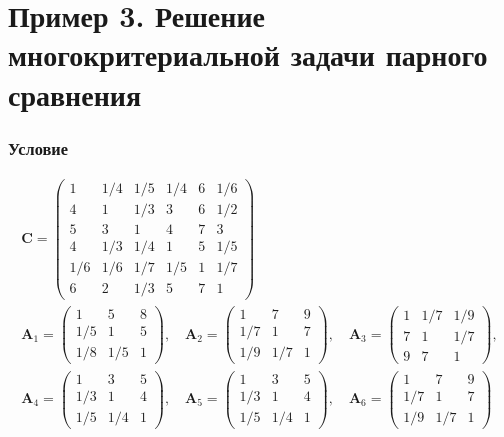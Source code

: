 \documentclass[specialist,
	substylefile = spbu_report.rtx,
	subf,href,colorlinks=true, 12pt]{disser}
\begin{document}
\section{Пример 3. Решение многокритериальной задачи парного сравнения} \label{appendix:full}

\subsubsection{Условие}
$$
	\begin{array}{l}
		\boldsymbol{C}=\left(\begin{array}{cccccc}
				1     & 1 / 4 & 1 / 5 & 1 / 4 & 6 & 1 / 6 \\
				4     & 1     & 1 / 3 & 3     & 6 & 1 / 2 \\
				5     & 3     & 1     & 4     & 7 & 3     \\
				4     & 1 / 3 & 1 / 4 & 1     & 5 & 1 / 5 \\
				1 / 6 & 1 / 6 & 1 / 7 & 1 / 5 & 1 & 1 / 7 \\
				6     & 2     & 1 / 3 & 5     & 7 & 1
			\end{array}\right)                                                                                                                \\
		\boldsymbol{A}_{1}=\left(\begin{array}{ccc}
				1     & 5     & 8 \\
				1 / 5 & 1     & 5 \\
				1 / 8 & 1 / 5 & 1
			\end{array}\right), \quad \boldsymbol{A}_{2}=\left(\begin{array}{ccc}
				1     & 7     & 9 \\
				1 / 7 & 1     & 7 \\
				1 / 9 & 1 / 7 & 1
			\end{array}\right), \quad \boldsymbol{A}_{3}=\left(\begin{array}{ccc}
				1 & 1 / 7 & 1 / 9 \\
				7 & 1     & 1 / 7 \\
				9 & 7     & 1
			\end{array}\right), \\
		\boldsymbol{A}_{4}=\left(\begin{array}{ccc}
				1     & 3     & 5 \\
				1 / 3 & 1     & 4 \\
				1 / 5 & 1 / 4 & 1
			\end{array}\right), \quad \boldsymbol{A}_{5}=\left(\begin{array}{ccc}
				1     & 3     & 5 \\
				1 / 3 & 1     & 4 \\
				1 / 5 & 1 / 4 & 1
			\end{array}\right), \quad \boldsymbol{A}_{6}=\left(\begin{array}{ccc}
				1     & 7     & 9 \\
				1 / 7 & 1     & 7 \\
				1 / 9 & 1 / 7 & 1
			\end{array}\right)
	\end{array}
$$
\end{document}
